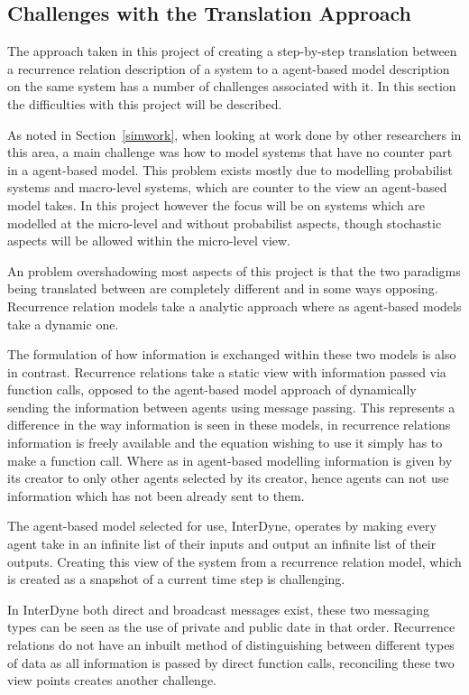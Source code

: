 \documentclass{article}
\begin{document}
\subsection{Challenges with the Translation Approach} \label{twoviewsapproach} 
The approach taken in this project of creating a step-by-step translation between a recurrence relation description of a system to a agent-based model description on the same system has a number of challenges associated with it. In this section the difficulties with this project will be described. 

As noted in Section~\ref{simwork}, when looking at work done by other researchers in this area, a main challenge was how to model systems that have no counter part in a agent-based model. This problem exists mostly due to modelling probabilist systems and macro-level systems, which are counter to the view an agent-based model takes. In this project however the focus will be on systems which are modelled at the micro-level and without probabilist aspects, though stochastic aspects will be allowed within the micro-level view.

An problem overshadowing most aspects of this project is  that the two paradigms being translated between are completely different and in some ways opposing. Recurrence relation models take a analytic approach where as agent-based models take a dynamic one.   

The formulation of how information is exchanged within these two models is also in contrast. Recurrence relations take a static view with information passed via function calls, opposed to the agent-based model approach of dynamically sending the information between agents using message passing. This represents a difference in the way information is seen in these models, in recurrence relations information is freely available and the equation wishing to use it simply has to make a function call. Where as in agent-based modelling information is given by its creator to only other agents selected by its creator, hence agents can not use information which has not been already sent to them.

The agent-based model selected for use, InterDyne, operates by making every agent take in an infinite list of their inputs and output an infinite list of their outputs. Creating this view of the system from a recurrence relation model, which is created as a snapshot of a current time step is challenging. 

In InterDyne both direct and broadcast messages exist, these two messaging types can be seen as the use of private and public date in that order. Recurrence relations do not have an inbuilt method of distinguishing between different types of data as all information is passed by direct function calls, reconciling these two view points creates another challenge. 
\end{document}

